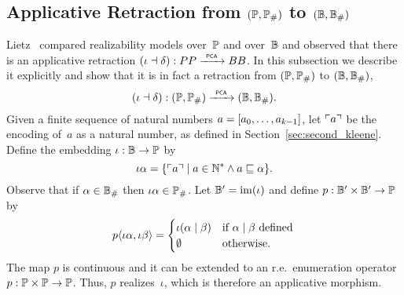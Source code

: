 

\subsection{Applicative Retraction from $(\mathbb{P}, \mathbb{P}_{\#})$ to
  $(\mathbb{B}, \mathbb{B}_{\#})$}
\label{sec:applicative_retraction_PP_BB}%

%
%

Lietz~\cite{Lietz:99} compared realizability models over~$\mathbb{P}$ and
over~$\mathbb{B}$ and observed that there is an applicative retraction
$(\iota \dashv \delta): PP \xrightarrow{\scriptscriptstyle\mathsf{\ PCA\ }}{} BB$. In this subsection we
describe it explicitly and show that it is in fact a retraction from
$(\mathbb{P}, \mathbb{P}_{\#})$ to $(\mathbb{B}, \mathbb{B}_{\#})$,
\begin{equation*}
  (\iota \dashv \delta): (\mathbb{P}, \mathbb{P}_{\#}) \xrightarrow{\scriptscriptstyle\mathsf{\ PCA\ }}{} (\mathbb{B}, \mathbb{B}_{\#}).
\end{equation*}
Given a finite sequence of natural numbers $a = [a_0, \ldots,
  a_{k-1}]$, let $\ulcorner a \urcorner$ be the encoding of~$a$ as a natural
number, as defined in Section~\ref{sec:second_kleene}. Define the
embedding $\iota: \mathbb{B} \to \mathbb{P}$ by
\begin{equation*}
  \iota \alpha =
  \{ \ulcorner a \urcorner \mid
    a \in \mathbb{N}^{*} \land a  \sqsubseteq \alpha 
    \}.
\end{equation*}
Observe that if $\alpha \in \mathbb{B}_{\#}$ then $\iota \alpha \in \mathbb{P}_{\#}$.
Let $\mathbb{B}' = \mathrm{im}(\iota)$ and define $p: \mathbb{B}' \times \mathbb{B}' \to \mathbb{P}$
by
\begin{equation*}
  p \langle \iota \alpha, \iota \beta \rangle =
  \begin{cases}
    \iota (\alpha \mid \beta) 
    & \text{if $\alpha \mid \beta$ defined} \,\\
    \emptyset
    & \text{otherwise}.
  \end{cases}
\end{equation*}
The map $p$ is continuous and it can be extended to an
r.e.~enumeration operator $p: \mathbb{P} \times \mathbb{P} \to \mathbb{P}$. Thus, $p$
realizes~$\iota$, which is therefore an applicative morphism.


